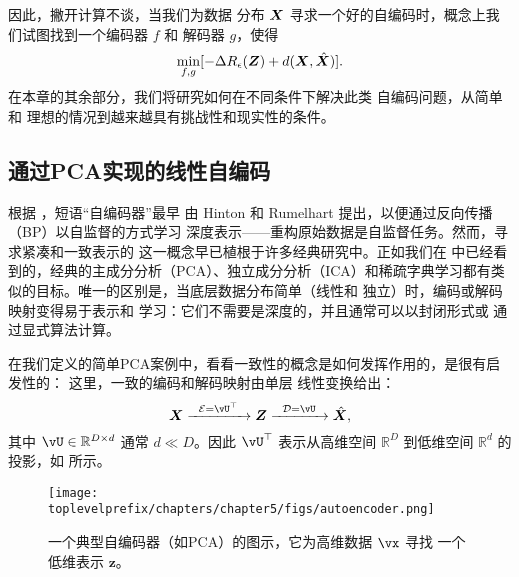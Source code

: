 \documentclass[../../book-main_zh.tex]{subfiles}
\begin{document}
因此，撇开计算不谈，当我们为数据
分布 $\bm{X}$ 寻求一个好的自编码时，概念上我们试图找到一个编码器 $f$ 和
解码器 $g$，使得
\begin{equation}
  \min_{f, g} [- \Delta R_{\epsilon}(\bm{Z}) + d(\bm{X}, \hat {\bm{X}})].
  \label{eqn:autoencode-objective-ch5}
\end{equation}
在本章的其余部分，我们将研究如何在不同条件下解决此类
自编码问题，从简单和
理想的情况到越来越具有挑战性和现实性的条件。


\subsection{通过PCA实现的线性自编码}
根据 \cite{Baldi2011}，短语“自编码器”最早
由 Hinton 和 Rumelhart \cite{Rumelhart1986} 提出，以便通过反向传播（BP）以自监督的方式学习
深度表示——重构原始数据是自监督任务。然而，寻求紧凑和一致表示的
这一概念早已植根于许多经典研究中。正如我们在  中已经看到的，经典的主成分分析（PCA）、独立成分分析（ICA）和稀疏字典学习都有类似的目标。唯一的区别是，当底层数据分布简单（线性和
独立）时，编码或解码映射变得易于表示和
学习：它们不需要是深度的，并且通常可以以封闭形式或
通过显式算法计算。

在我们定义的简单PCA案例中，看看一致性的概念是如何发挥作用的，是很有启发性的：
这里，一致的编码和解码映射由单层
线性变换给出：
\begin{equation}
  \X \xrightarrow{\hspace{2mm} \mathcal{E} = \vU^\top \hspace{2mm}}
  \Z \xrightarrow{\hspace{2mm} \mathcal{D} = \vU \hspace{2mm}}   \hat{\X},
  \label{eqn:autoencoding-PCA-2}
\end{equation}
其中 $\vU \in \mathbb{R}^{D\times d}$ 通常 $d\ll D$。因此
$\vU^\top$ 表示从高维空间
$\mathbb{R}^{D}$ 到低维空间 $\mathbb{R}^{d}$ 的投影，如
 所示。
\begin{figure}
  \centering \texttt{[image: \\toplevelprefix/chapters/chapter5/figs/autoencoder.png]}
  \caption{一个典型自编码器（如PCA）的图示，它为高维数据 $\vx$ 寻找
  一个低维表示 $\bm{z}$。}
  \label{fig:AE}
\end{figure}
\end{document}
